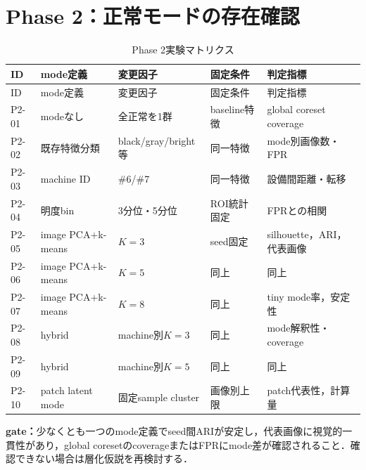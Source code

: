 \documentclass[a4paper,11pt]{ltjsarticle}
\begin{document}
\section{Phase 2：正常モードの存在確認}
\begin{landscape}
\begin{longtable}{L{18mm}L{42mm}L{45mm}L{45mm}L{45mm}}
\caption{Phase 2実験マトリクス}\\
\toprule
ID & mode定義 & 変更因子 & 固定条件 & 判定指標 \\
\midrule
\endfirsthead
\toprule
ID & mode定義 & 変更因子 & 固定条件 & 判定指標 \\
\midrule
\endhead
P2-01 & modeなし & 全正常を1群 & baseline特徴 & global coreset coverage \\
P2-02 & 既存特徴分類 & black/gray/bright等 & 同一特徴 & mode別画像数・FPR \\
P2-03 & machine ID & \#6/\#7 & 同一特徴 & 設備間距離・転移 \\
P2-04 & 明度bin & 3分位・5分位 & ROI統計固定 & FPRとの相関 \\
P2-05 & image PCA+k-means & $K=3$ & seed固定 & silhouette，ARI，代表画像 \\
P2-06 & image PCA+k-means & $K=5$ & 同上 & 同上 \\
P2-07 & image PCA+k-means & $K=8$ & 同上 & tiny mode率，安定性 \\
P2-08 & hybrid & machine別$K=3$ & 同上 & mode解釈性・coverage \\
P2-09 & hybrid & machine別$K=5$ & 同上 & 同上 \\
P2-10 & patch latent mode & 固定sample cluster & 画像別上限 & patch代表性，計算量 \\
\bottomrule
\end{longtable}
\end{landscape}
\textbf{gate：}少なくとも一つのmode定義でseed間ARIが安定し，代表画像に視覚的一貫性があり，global coresetのcoverageまたはFPRにmode差が確認されること．確認できない場合は層化仮説を再検討する．
\end{document}
